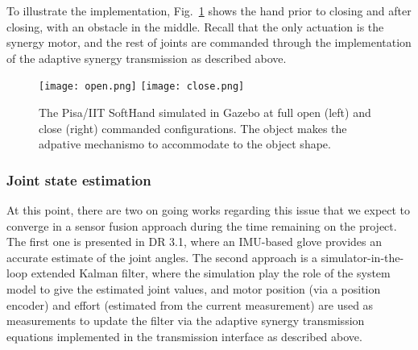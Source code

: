 To illustrate the implementation, Fig.~\ref{fig:soft_hand_gazebo} shows the hand prior to closing and after closing, with an obstacle in the middle. Recall that the only actuation is the synergy motor, and the rest of joints are commanded through the implementation of the adaptive synergy transmission as described above.

\begin{figure}
\centering
\texttt{[image: open.png]}
\hspace{1pt}
\texttt{[image: close.png]}
\caption{The Pisa/IIT SoftHand simulated in Gazebo at full open (left) and close (right) commanded configurations. The object makes the adpative mechanismo to accommodate to the object shape.}
\label{fig:soft_hand_gazebo}
\end{figure}

\subsubsection{Joint state estimation}

At this point, there are two on going works regarding this issue that we expect to converge in a sensor fusion approach during the time remaining on the project. The first one is presented in DR 3.1, where an IMU-based glove provides an accurate estimate of the joint angles. The second approach is a simulator-in-the-loop extended Kalman filter, where the simulation play the role of the system model to give the estimated joint values, and motor position (via a position encoder) and effort (estimated from the current measurement) are used as measurements to update the filter via the adaptive synergy transmission equations implemented in the transmission interface as described above. %